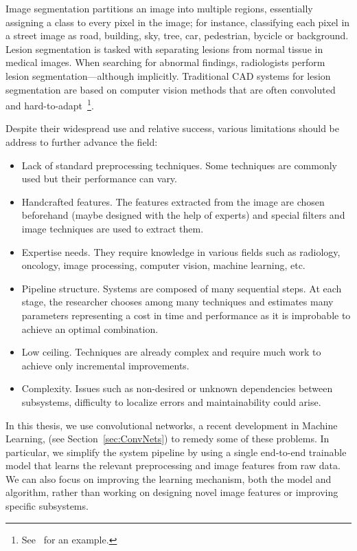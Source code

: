 Image segmentation partitions an image into multiple regions, essentially assigning a class to every pixel in the image; for instance, classifying each pixel in a street image as road, building, sky, tree, car, pedestrian, bycicle or background. Lesion segmentation is tasked with separating lesions from normal tissue in medical images. When searching for abnormal findings, radiologists perform lesion segmentation---although implicitly. Traditional CAD systems for lesion segmentation are based on computer vision methods that are often convoluted and hard-to-adapt~\footnote{See~\cite{Ashraf2013} for an example.}. 

Despite their widespread use and relative success, various limitations should be address to further advance the field:
\begin{itemize}
	\item Lack of standard preprocessing techniques. Some techniques are commonly used but their performance can vary.
	\item Handcrafted features. The features extracted from the image are chosen beforehand (maybe designed with the help of experts) and special filters and image techniques are used to extract them.
	\item Expertise needs. They require knowledge in various fields such as radiology, oncology, image processing, computer vision, machine learning, etc.
	\item Pipeline structure. Systems are composed of many sequential steps. At each stage, the researcher chooses among many techniques and estimates many parameters representing a cost in time and performance as it is improbable to achieve an optimal combination.
	\item Low ceiling. Techniques are already complex and require much work to achieve only incremental improvements.
	\item Complexity. Issues such as non-desired or unknown dependencies between subsystems, difficulty to localize errors and maintainability could arise. 
\end{itemize}

In this thesis, we use convolutional networks, a recent development in Machine Learning, (see Section~\ref{sec:ConvNets}) to remedy some of these problems. In particular, we simplify the system pipeline by using a single end-to-end trainable model that learns the relevant preprocessing and image features from raw data. We can also focus on improving the learning mechanism, both the model and algorithm, rather than working on designing novel image features or improving specific subsystems.
